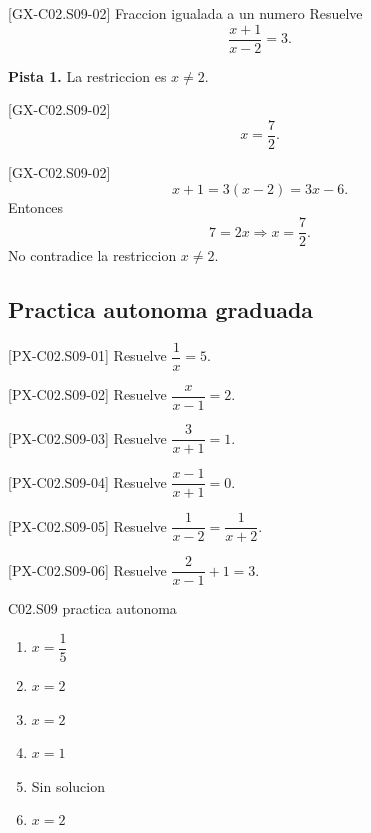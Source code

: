 \begin{guidedexercise}{[GX-C02.S09-02] Fraccion igualada a un numero}
Resuelve
\[
\frac{x+1}{x-2}=3.
\]

\textbf{Pista 1.} La restriccion es \(x\neq 2\).
\end{guidedexercise}

\begin{shortanswer}{[GX-C02.S09-02]}
\[
x=\frac{7}{2}.
\]
\end{shortanswer}

\begin{fullsolution}{[GX-C02.S09-02]}
\[
x+1=3(x-2)=3x-6.
\]
Entonces
\[
7=2x \Longrightarrow x=\frac{7}{2}.
\]
No contradice la restriccion \(x\neq 2\).
\end{fullsolution}

\subsection*{Practica autonoma graduada}
\begin{exercise}{[PX-C02.S09-01] Resuelve \(\dfrac{1}{x}=5\).}
\end{exercise}
\begin{exercise}{[PX-C02.S09-02] Resuelve \(\dfrac{x}{x-1}=2\).}
\end{exercise}
\begin{exercise}{[PX-C02.S09-03] Resuelve \(\dfrac{3}{x+1}=1\).}
\end{exercise}
\begin{exercise}{[PX-C02.S09-04] Resuelve \(\dfrac{x-1}{x+1}=0\).}
\end{exercise}
\begin{exercise}{[PX-C02.S09-05] Resuelve \(\dfrac{1}{x-2}=\dfrac{1}{x+2}\).}
\end{exercise}
\begin{exercise}{[PX-C02.S09-06] Resuelve \(\dfrac{2}{x-1}+1=3\).}
\end{exercise}

\begin{shortanswer}{C02.S09 practica autonoma}
\begin{enumerate}[label=\textbf{PX-C02.S09-\arabic*:}, leftmargin=*]
  \item \(x=\dfrac{1}{5}\)
  \item \(x=2\)
  \item \(x=2\)
  \item \(x=1\)
  \item Sin solucion
  \item \(x=2\)
\end{enumerate}
\end{shortanswer}

